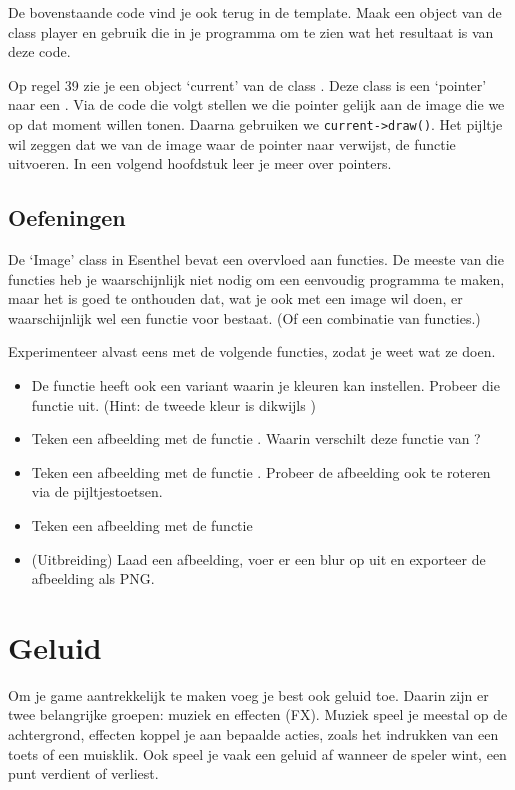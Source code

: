 De bovenstaande code vind je ook terug in de template. Maak een object van de class player en gebruik die in je programma om te zien wat het resultaat is van deze code.

\begin{note}
Op regel 39 zie je een object `current' van de class . Deze class is een `pointer' naar een . Via de code die volgt stellen we die pointer gelijk aan de image die we op dat moment willen tonen. Daarna gebruiken we \verb|current->draw()|. Het pijltje wil zeggen dat we van de image waar de pointer naar verwijst, de functie  uitvoeren. In een volgend hoofdstuk leer je meer over pointers.
\end{note}

\subsection{Oefeningen}
De `Image' class in Esenthel bevat een overvloed aan functies. De meeste van die functies heb je waarschijnlijk niet nodig om een eenvoudig programma te maken, maar het is goed te onthouden dat, wat je ook met een image wil doen, er waarschijnlijk wel een functie voor bestaat. (Of een combinatie van functies.)

Experimenteer alvast eens met de volgende functies, zodat je weet wat ze doen.

\begin{itemize}
\item De functie  heeft ook een variant waarin je kleuren kan instellen. Probeer die functie uit. (Hint: de tweede kleur is dikwijls )
\item Teken een afbeelding met de functie . Waarin verschilt deze functie van ?
\item Teken een afbeelding met de functie . Probeer de afbeelding ook te roteren via de pijltjestoetsen.
\item Teken een afbeelding met de functie 
\item (Uitbreiding) Laad een afbeelding, voer er een blur op uit en exporteer de afbeelding als PNG.
\end{itemize}

\section{Geluid}
Om je game aantrekkelijk te maken voeg je best ook geluid toe. Daarin zijn er twee belangrijke groepen: muziek en effecten (FX). Muziek speel je meestal op de achtergrond, effecten koppel je aan bepaalde acties, zoals het indrukken van een toets of een muisklik. Ook speel je vaak een geluid af wanneer de speler wint, een punt verdient of verliest.

